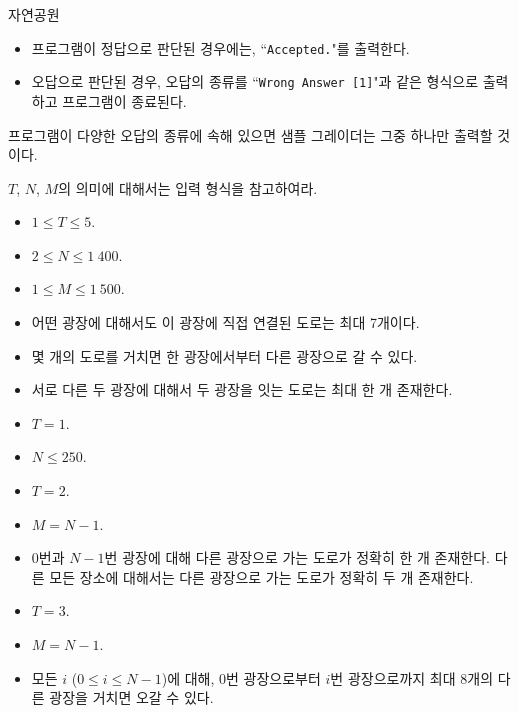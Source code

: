 \begin{problem}{자연공원}
	\begin{itemize}
		\item 프로그램이 정답으로 판단된 경우에는,  ``\texttt{Accepted.}"를 출력한다.
		\item 오답으로 판단된 경우, 오답의 종류를 ``\texttt{Wrong Answer [1]}"과 같은 형식으로 출력하고 프로그램이 종료된다.
	\end{itemize}
	
	프로그램이 다양한 오답의 종류에 속해 있으면 샘플 그레이더는 그중 하나만 출력할 것이다.
	
	\Constraints
	
	$T$, $N$, $M$의 의미에 대해서는 입력 형식을 참고하여라.
	
	\begin{itemize}
		\item $1 \le T \le 5$.
		\item $2 \le N \le 1\ 400$.
		\item $1 \le M \le 1\ 500$.
		\item 어떤 광장에 대해서도 이 광장에 직접 연결된 도로는 최대 7개이다.
		\item 몇 개의 도로를 거치면 한 광장에서부터 다른 광장으로 갈 수 있다.
		\item 서로 다른 두 광장에 대해서 두 광장을 잇는 도로는 최대 한 개 존재한다.
	\end{itemize}
	
	

	\begin{itemize}
		\item $T = 1$.
		\item $N \le 250$.
	\end{itemize}
	
	\begin{itemize}
		\item $T = 2$.
		\item $M = N-1$.
		\item 0번과 $N-1$번 광장에 대해 다른 광장으로 가는 도로가 정확히 한 개 존재한다. 다른 모든 장소에 대해서는 다른 광장으로 가는 도로가 정확히 두 개 존재한다.
	\end{itemize}
	
	\begin{itemize}
		\item $T = 3$.
		\item $M = N-1$.
		\item 모든 $i$ ($0 \le i \le N-1$)에 대해, 0번 광장으로부터 $i$번 광장으로까지 최대 8개의 다른 광장을 거치면 오갈 수 있다.
	\end{itemize}
	

\end{problem}
